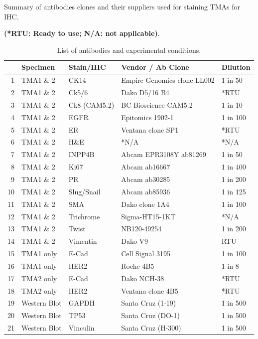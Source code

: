 \begin{table}
\centering
\caption{List of antibodies and experimental conditions.}
Summary of antibodies clones and their suppliers used for staining TMAs for IHC.

\small\textbf{(*RTU: Ready to use; N/A: not applicable)}.
\label{stab:antibodieslist}
\begin{tabular}{|rl|l|l|l|}
  \hline
 & Specimen & Stain/IHC & Vendor / Ab Clone & Dilution  \\ 
  \hline
1 & TMA1 \& 2 & CK14 & Empire Genomics clone LL002 & 1 in 50 \\ 
  2 & TMA1 \& 2 & Ck5/6 & Dako D5/16 B4 & *RTU  \\ 
  3 & TMA1 \& 2 & Ck8 (CAM5.2) & BC Bioscience CAM5.2 & 1 in 10  \\ 
  4 & TMA1 \& 2 & EGFR & Epitomics 1902-1 & 1 in 100  \\ 
  5 & TMA1 \& 2 & ER & Ventana  clone SP1 & *RTU\\ 
  6 & TMA1 \& 2 & H\&E & *N/A & *N/A \\ 
  7 & TMA1 \& 2 & INPP4B & Abcam EPR3108Y ab81269 & 1 in 50 \\ 
  8 & TMA1 \& 2 & Ki67 & Abcam ab16667  & 1 in 400  \\ 
  9 & TMA1 \& 2 & PR & Abcam ab30285 & 1 in 200  \\ 
  10 & TMA1 \& 2 & Slug/Snail & Abcam ab85936 & 1 in 125 \\ 
  11 & TMA1 \& 2 & SMA & Dako clone 1A4 & 1 in 100 \\ 
  12 & TMA1 \& 2 & Trichrome & Sigma-HT15-1KT & *N/A \\ 
  13 & TMA1 \& 2 & Twist & NB120-49254 & 1 in 200\\ 
  14 & TMA1 \& 2 & Vimentin & Dako V9 & RTU  \\ 
  15 & TMA1 only & E-Cad & Cell Signal 3195 & 1 in 100  \\ 
  16 & TMA1 only & HER2 & Roche 4B5 & 1 in 8  \\ 
  17 & TMA2 only & E-Cad & Dako NCH-38 & *RTU  \\ 
  18 & TMA2 only & HER2 & Ventana  clone 4B5 & *RTU \\ 
  19 & Western Blot & GAPDH  & Santa Cruz (1-19) & 1 in 500  \\ 
  20 & Western Blot & TP53 & Santa Cruz (DO-1) & 1 in 500  \\ 
  21 & Western Blot & Vinculin & Santa Cruz (H-300) & 1 in 500  \\ 
   \hline
\end{tabular}%
\end{table}




